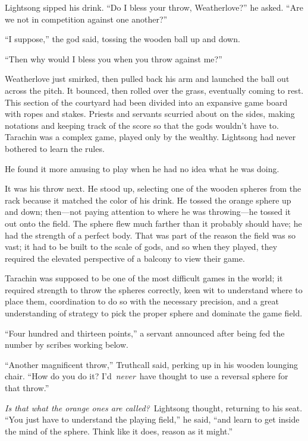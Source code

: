 Lightsong sipped his drink. “Do I bless your throw, Weatherlove?” he asked. “Are we not in competition against one another?”

“I suppose,” the god said, tossing the wooden ball up and down.

“Then why would I bless you when you throw against me?”

Weatherlove just smirked, then pulled back his arm and launched the ball out across the pitch. It bounced, then rolled over the grass, eventually coming to rest. This section of the courtyard had been divided into an expansive game board with ropes and stakes. Priests and servants scurried about on the sides, making notations and keeping track of the score so that the gods wouldn’t have to. Tarachin was a complex game, played only by the wealthy. Lightsong had never bothered to learn the rules.

He found it more amusing to play when he had no idea what he was doing.

It was his throw next. He stood up, selecting one of the wooden spheres from the rack because it matched the color of his drink. He tossed the orange sphere up and down; then—not paying attention to where he was throwing—he tossed it out onto the field. The sphere flew much farther than it probably should have; he had the strength of a perfect body. That was part of the reason the field was so vast; it had to be built to the scale of gods, and so when they played, they required the elevated perspective of a balcony to view their game.

Tarachin was supposed to be one of the most difficult games in the world; it required strength to throw the spheres correctly, keen wit to understand where to place them, coordination to do so with the necessary precision, and a great understanding of strategy to pick the proper sphere and dominate the game field.

“Four hundred and thirteen points,” a servant announced after being fed the number by scribes working below.

“Another magnificent throw,” Truthcall said, perking up in his wooden lounging chair. “How do you do it? I’d~\textit{never}~have thought to use a reversal sphere for that throw.”

\textit{Is that what the orange ones are called?}~Lightsong thought, returning to his seat. “You just have to understand the playing field,” he said, “and learn to get inside the mind of the sphere. Think like it does, reason as it might.”

